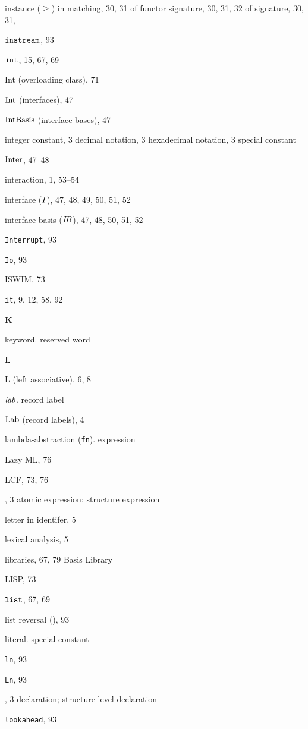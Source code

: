 \begin{theindex}
\item instance ($\geq$) 
\subitem in matching, 30, 31
\subitem of functor signature, 30, 31, 32
\subitem of signature, 30, 31, 
\item $\mbox{\tt instream}$, 93
\item $\mbox{\tt int}$, 15, 67, 69
\item Int (overloading class), 71
\item ${\rm Int}$ (interfaces), 47
\item ${\rm IntBasis}$ (interface bases), 47
\item integer constant, 3
\subitem decimal notation, 3
\subitem hexadecimal notation, 3
\subitem \seealso special constant
\item $\mathop{\rm Inter}\nolimits$, 47--48
\item interaction, 1, 53--54
\item interface ($I$), 47, 48, 49, 50, 51, 52
\item interface basis ($\mbox{$I\!B$}$), 47, 48, 50, 51, 52
\item {\tt Interrupt}, 93
\item {\tt Io}, 93
\item ISWIM, 73
\item {\tt it}, 9, 12, 58, 92
\indexspace

\parbox{65mm}{\hfil{\large\bf K}\hfil}

\indexspace
\item keyword. \see reserved word
\indexspace

\parbox{65mm}{\hfil{\large\bf L}\hfil}

\indexspace

\item L (left associative), 6, 8
\item ${\it lab}$. \see record label
\item ${\rm Lab}$ (record labels), 4
\item lambda-abstraction ({\tt fn}). \see expression
\item Lazy ML, 76
\item LCF, 73, 76
\item \LET, 3
\subitem \seealso atomic expression; structure expression
\item letter in identifer, 5
\item lexical analysis, 5
\item libraries, 67, 79
\subitem \seealso Basis Library
\item LISP, 73
\item $\mbox{\tt list}$, 67, 69
\item list reversal (), 93
\item literal. \see special constant
\item {\tt ln}, 93
\item {\tt Ln}, 93
\item \LOCAL, 3
\subitem \seealso declaration; structure-level declaration
\item {\tt lookahead}, 93
\indexspace


\end{theindex}
